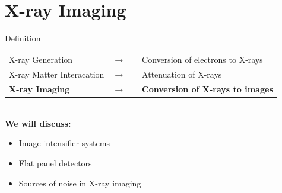 


\subtitle{X-Ray - Part 3}
\frame[plain,c]{\titlepage} %


\section{X-ray Imaging}

\begin{frame}{Definition}
    \begin{tabular}{lccl}
        X-ray Generation          & {$\longrightarrow$}          &  & Conversion of electrons to X-rays       \\
        X-ray Matter Interacation & {$\longrightarrow$}          &  & Attenuation of X-rays                   \\
        \textbf{X-ray Imaging}    & \textbf{{$\longrightarrow$}} &  & \textbf{Conversion of X-rays to images}
    \end{tabular}\\
    \vspace{2cm}
    \textbf{We will discuss:}
    \begin{itemize}
        \item Image intensifier systems
        \item Flat panel detectors
        \item Sources of noise in X-ray imaging
    \end{itemize}
\end{frame}

